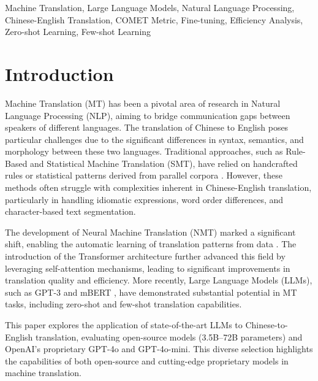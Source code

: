 \documentclass[conference]{IEEEtran}
\begin{document}
\begin{IEEEkeywords}
Machine Translation, Large Language Models, Natural Language Processing, Chinese-English Translation, COMET Metric, Fine-tuning, Efficiency Analysis, Zero-shot Learning, Few-shot Learning
\end{IEEEkeywords}

\section{Introduction}

Machine Translation (MT) has been a pivotal area of research in Natural Language Processing (NLP), aiming to bridge communication gaps between speakers of different languages. The translation of Chinese to English poses particular challenges due to the significant differences in syntax, semantics, and morphology between these two languages. Traditional approaches, such as Rule-Based and Statistical Machine Translation (SMT), have relied on handcrafted rules or statistical patterns derived from parallel corpora \cite{koehn2009statistical}. However, 
these methods often struggle with complexities inherent in Chinese-English translation, particularly in handling idiomatic expressions, word order differences, and character-based text segmentation.

The development of Neural Machine Translation (NMT) marked a significant shift, enabling the automatic learning of translation patterns from data \cite{sutskever2014sequence}. The introduction of the Transformer architecture \cite{vaswani2017attention} further advanced this field by leveraging self-attention mechanisms, leading to significant improvements in translation quality and efficiency. More recently, Large Language Models (LLMs), such as GPT-3 \cite{brown2020language} and mBERT \cite{devlin2018bert}, have demonstrated substantial potential in MT tasks, including zero-shot and few-shot translation capabilities.

This paper explores the application of state-of-the-art LLMs to Chinese-to-English translation, evaluating open-source models (3.5B–72B parameters) and OpenAI’s proprietary GPT-4o and GPT-4o-mini. This diverse selection highlights the capabilities of both open-source and cutting-edge proprietary models in machine translation.
\end{document}
